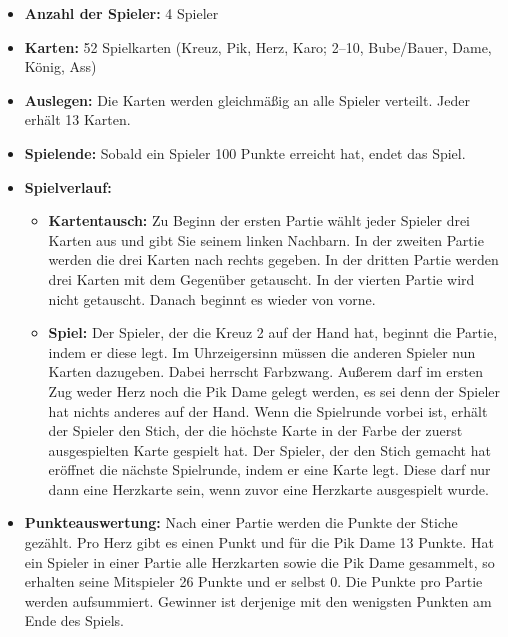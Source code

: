 \documentclass[titlepage,10pt,a4paper]{article}
\begin{document}
\begin{itemize}
	\item \textbf{Anzahl der Spieler:} 4 Spieler
	\item \textbf{Karten:}  52 Spielkarten (Kreuz, Pik, Herz, Karo; 2–10, Bube/Bauer, Dame, König, Ass)
	\item \textbf{Auslegen:} Die Karten werden gleichmäßig an alle Spieler verteilt. Jeder erhält 13 Karten.
	\item \textbf{Spielende:} Sobald ein Spieler 100 Punkte erreicht hat, endet das Spiel.
	\item \textbf{Spielverlauf:}
	\begin{itemize}
		\item \textbf{Kartentausch:} Zu Beginn der ersten \gls{Partie} wählt jeder Spieler drei Karten aus und gibt Sie seinem linken Nachbarn. In der zweiten \gls{Partie} werden die drei Karten nach rechts gegeben. In der dritten \gls{Partie} werden drei Karten mit dem Gegenüber getauscht. In der vierten \gls{Partie} wird nicht getauscht. Danach beginnt es wieder von vorne.
		\item \textbf{Spiel:} Der Spieler, der die Kreuz 2 auf der Hand hat, beginnt die \gls{Partie}, indem er diese legt. Im Uhrzeigersinn müssen die anderen Spieler nun Karten dazugeben. Dabei herrscht \gls{Farbzwang}. Außerem darf im ersten Zug weder Herz noch die Pik Dame gelegt werden, es sei denn der Spieler hat nichts anderes auf der Hand. Wenn die \gls{Spielrunde} vorbei ist, erhält der Spieler den \gls{Stich}, der die höchste Karte in der Farbe der zuerst ausgespielten Karte gespielt hat. Der Spieler, der den \gls{Stich} gemacht hat eröffnet die nächste \gls{Spielrunde}, indem er eine Karte legt. Diese darf nur dann eine Herzkarte sein, wenn zuvor eine Herzkarte ausgespielt wurde.
	\end{itemize}
	\item \textbf{Punkteauswertung:} Nach einer \gls{Partie} werden die Punkte der \gls{Stich}e gezählt. Pro Herz gibt es einen Punkt und für die Pik Dame 13 Punkte. Hat ein Spieler in einer \gls{Partie} alle Herzkarten sowie die Pik Dame gesammelt, so erhalten seine Mitspieler 26 Punkte und er selbst 0. Die Punkte pro Partie werden aufsummiert. Gewinner ist derjenige mit den wenigsten Punkten am Ende des Spiels.
\end{itemize}
\end{document}
